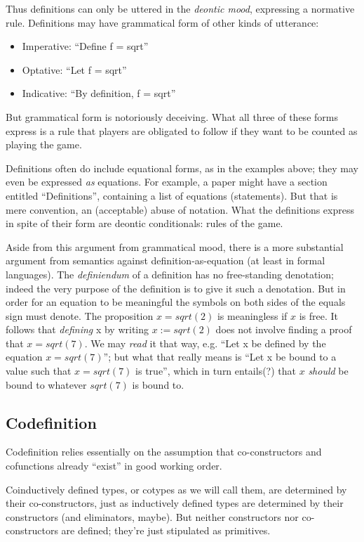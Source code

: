 Thus definitions can only be uttered in the \textit{deontic mood},
expressing a normative rule. Definitions may have grammatical form of
other kinds of utterance:

\begin{itemize}
\item Imperative: ``Define f = sqrt''
\item Optative: ``Let  f = sqrt''
\item Indicative: ``By definition, f = sqrt''
\end{itemize}

But grammatical form is notoriously deceiving. What all three of these
forms express is a rule that players are obligated to follow if they
want to be counted as playing the game.

Definitions often do include equational forms, as in the examples
above; they may even be expressed \textit{as} equations. For example,
a paper might have a section entitled ``Definitions'', containing a
list of equations (statements). But that is mere convention, an
(acceptable) abuse of notation. What the definitions express in spite
of their form are deontic conditionals: rules of the game.

Aside from this argument from grammatical mood, there is a more
substantial argument from semantics against definition-as-equation (at
least in formal languages). The \textit{definiendum} of a definition
has no free-standing denotation; indeed the very purpose of the
definition is to give it such a denotation. But in order for an
equation to be meaningful the symbols on both sides of the equals sign
must denote. The proposition \(x = sqrt(2)\) is meaningless if \(x\)
is free. It follows that \textit{defining} x by writing \(x :=
sqrt(2)\) does not involve finding a proof that \(x = sqrt(7)\). We
may \textit{read} it that way, e.g. ``Let x be defined by the equation
\(x = sqrt(7)\)''; but what that really means is ``Let x be bound to a
value such that \(x = sqrt(7)\) is true'', which in turn entails(?)
that \(x\) \textit{should} be bound to whatever \(sqrt(7)\) is bound
to.

\subsection{Codefinition}

Codefinition relies essentially on the assumption that co-constructors
and cofunctions already ``exist'' in good working order.

Coinductively defined types, or cotypes as we will call them, are
determined by their co-constructors, just as inductively defined types
are determined by their constructors (and eliminators, maybe). But
neither constructors nor co-constructors are defined; they're just
stipulated as primitives.

